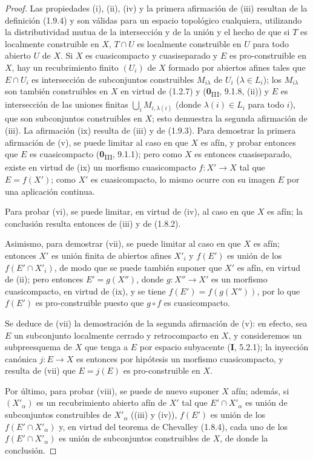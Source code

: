 \begin{proof}
Las propiedades (i), (ii), (iv) y la primera afirmación de (iii) resultan
de la definición (1.9.4) y son válidas para un espacio topológico
cualquiera, utilizando la distributividad mutua de la intersección y de
la unión y el hecho de que si $T$ es localmente construible en $X$,
$T\cap U$ es localmente construible en $U$ para todo abierto $U$ de $X$.
Si $X$ es cuasicompacto y cuasiseparado y $E$ es pro-construible en
$X$, hay un recubrimiento finito $(U_i)$ de $X$ formado por abiertos afines tales
que $E\cap U_i$ es intersección de subconjuntos construibles $M_{i\lambda}$
de $U_i$ ($\lambda\in L_i$); los $M_{i\lambda}$ son también construibles
en $X$ en virtud de (1.2.7) y (\textbf{0}\textsubscript{III}, 9.1.8, (ii)) y $E$ es
intersección de las uniones finitas $\bigcup_iM_{i,\lambda(i)}$ (donde
$\lambda(i)\in L_i$ para todo $i$), que son subconjuntos construibles en
$X$; esto demuestra la segunda afirmación de (iii). La afirmación (ix) resulta
de (iii) y de (1.9.3). Para demostrar la primera afirmación de (v), se puede
limitar al caso en que $X$ es afín, y probar entonces que $E$ es
cuasicompacto (\textbf{0}\textsubscript{III}, 9.1.1); pero como $X$ es entonces
cuasiseparado, existe en virtud de (ix) un morfismo cuasicompacto
$f:X'\to X$ tal que $E=f(X')$; como $X'$ es cuasicompacto, lo mismo
ocurre con su imagen $E$ por una aplicación continua.

Para probar (vi), se puede limitar, en virtud de (iv), al caso en que $X$ es
afín; la conclusión resulta entonces de (iii) y de (1.8.2).


Asimismo, para demostrar (vii), se puede limitar al caso en que $X$ es afín;
entonces $X'$ es unión finita de abiertos afines $X'_i$ y $f(E')$ es unión
de los $f(E'\cap X'_i)$, de modo que se puede también suponer que $X'$ es afín,
en virtud de (ii); pero entonces $E'=g(X'')$, donde $g:X''\to X'$ es un morfismo
cuasicompacto, en virtud de (ix), y se tiene $f(E')=f(g(X''))$, por lo que $f(E')$ es
pro-construible puesto que $g\circ f$ es cuasicompacto.

Se deduce de (vii) la demostración de la segunda afirmación de (v): en
efecto, sea $E$ un subconjunto localmente cerrado y retrocompacto en $X$, y
consideremos un subpreesquema de $X$ que tenga a $E$ por espacio subyacente (\textbf{I},
5.2.1); la inyección canónica $j:E\to X$ es entonces por hipótesis un
morfismo cuasicompacto, y resulta de (vii) que $E=j(E)$ es
pro-construible en $X$.

Por último, para probar (viii), se puede de nuevo suponer $X$ afín; además, si
$(X'_\alpha)$ es un recubrimiento abierto afín de $X'$ tal que
$E'\cap X'_\alpha$ es unión de subconjuntos construibles de $X'_\alpha$
((iii) y (iv)), $f(E')$ es unión de los $f(E'\cap X'_\alpha)$ y, en virtud
del teorema de Chevalley (1.8.4), cada uno de los $f(E'\cap X'_\alpha)$ es
unión de subconjuntos construibles de $X$, de donde la conclusión.
\end{proof}

